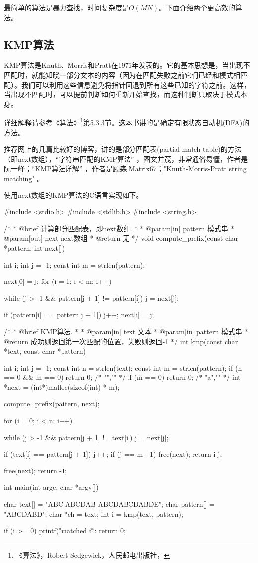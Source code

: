 最简单的算法是暴力查找，时间复杂度是$O(MN)$。下面介绍两个更高效的算法。


\subsection{KMP算法}
KMP算法是Knuth、Morris和Pratt在1976年发表的。它的基本思想是，当出现不匹配时，就能知晓一部分文本的内容（因为在匹配失败之前它们已经和模式相匹配）。我们可以利用这些信息避免将指针回退到所有这些已知的字符之前。这样，当出现不匹配时，可以提前判断如何重新开始查找，而这种判断只取决于模式本身。

详细解释请参考《算法》\footnote{《算法》，Robert 
Sedgewick，人民邮电出版社，}第5.3.3节。这本书讲的是确定有限状态自动机(DFA)的方法。

推荐网上的几篇比较好的博客，讲的是部分匹配表(partial match 
table)的方法（即next数组），“字符串匹配的KMP算法” 
，图文并茂，非常通俗易懂，作者是阮一峰；“KMP算法详解” 
，作者是顾森 
Matrix67；"Knuth-Morris-Pratt string matching" 
。

使用next数组的KMP算法的C语言实现如下。
\begin{Codex}[label=kmp.c]
#include <stdio.h>
#include <stdlib.h>
#include <string.h>

/*
 * @brief 计算部分匹配表，即next数组.
 *
 * @param[in] pattern 模式串
 * @param[out] next next数组
 * @return 无
 */
void compute_prefix(const char *pattern, int next[]) {
    int i;
    int j = -1;
    const int m = strlen(pattern);

    next[0] = j;
    for (i = 1; i < m; i++) {
        while (j > -1 && pattern[j + 1] != pattern[i]) j = next[j];

        if (pattern[i] == pattern[j + 1]) j++;
        next[i] = j;
    }
}

/*
 * @brief KMP算法.
 *
 * @param[in] text 文本
 * @param[in] pattern 模式串
 * @return 成功则返回第一次匹配的位置，失败则返回-1
 */
int kmp(const char *text, const char *pattern) {
    int i;
    int j = -1;
    const int n = strlen(text);
    const int m = strlen(pattern);
    if (n == 0 && m == 0) return 0; /* "","" */
    if (m == 0) return 0;  /* "a","" */
    int *next = (int*)malloc(sizeof(int) * m);

    compute_prefix(pattern, next);

    for (i = 0; i < n; i++) {
        while (j > -1 && pattern[j + 1] != text[i]) j = next[j];

        if (text[i] == pattern[j + 1]) j++;
        if (j == m - 1) {
            free(next);
            return i-j;
        }
    }

    free(next);
    return -1;
}


int main(int argc, char *argv[]) {
    char text[] = "ABC ABCDAB ABCDABCDABDE";
    char pattern[] = "ABCDABD";
    char *ch = text;
    int i = kmp(text, pattern);

    if (i >= 0) printf("matched @: %
    return 0;
}
\end{Codex}



